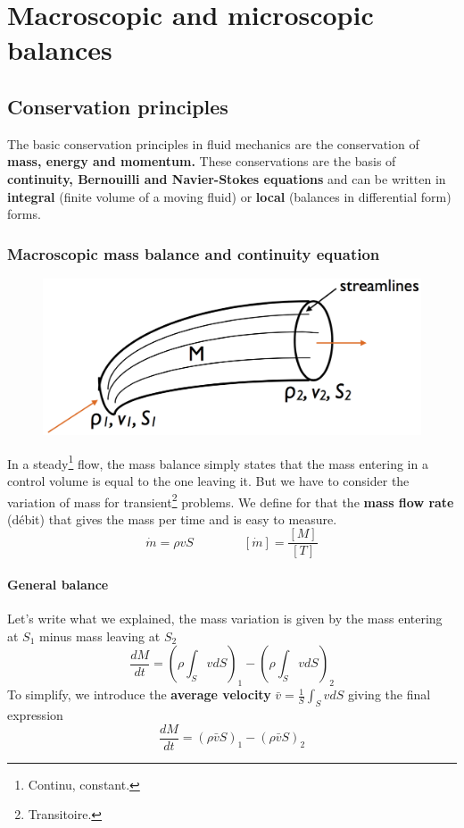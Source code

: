 
\chapter{Macroscopic and microscopic balances}
\section{Conservation principles}
	The basic conservation principles in fluid mechanics are the conservation of \textbf{mass, energy and momentum.} These conservations are the basis of \textbf{continuity, Bernouilli and Navier-Stokes equations} and can be written in \textbf{integral} (finite volume of a moving fluid) or \textbf{local} (balances in differential form) forms. 
	
	\subsection{Macroscopic mass balance and continuity equation}
		\begin{figure}
		\vspace{-5mm}
		\includegraphics[scale=0.20]{ch2/1}
		\end{figure}
		In a steady\footnote{Continu, constant.} flow, the mass balance simply states that the mass entering in a control volume is equal to the one leaving it. But we have to consider the variation of mass for transient\footnote{Transitoire.} problems. We define for that the  \textbf{mass flow rate} (débit) that gives the mass per time and is easy to measure. 
		\begin{equation}
			\dot{m} = \rho v S \qquad \qquad [\dot{m}] = \frac{[M]}{[T]}
		\end{equation}
		
		\subsubsection{General balance}
		Let's write what we explained, the mass variation is given by the mass entering at $S_1$ minus mass leaving at $S_2$		
		\begin{equation}
			\frac{dM}{dt} = \left(\rho \int _{S} v dS\right)_1 - \left(\rho \int _{S} v dS\right)_2
		\end{equation}
		To simplify, we introduce the \textbf{average velocity} $\bar{v} = \frac{1}{S}\int _S vdS$	giving the final expression
		\begin{equation}
			\frac{dM}{dt} = \left(\rho \bar{v} S\right)_1 - \left(\rho \bar{v} S\right)_2
		\end{equation}

